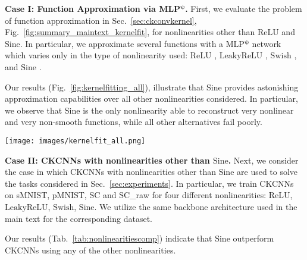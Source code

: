 \documentclass{article}
\newcommand{\mlp}{{\btt MLP}}
\begin{document}
\textbf{Case I: Function Approximation via \mlp$^{\boldsymbol{\psi}}$.} First, we evaluate the problem of function approximation in Sec.~\ref{sec:ckconvkernel}, Fig.~\ref{fig:summary_maintext_kernelfit}, for nonlinearities other than $\mathrm{ReLU}$ and $\mathrm{Sine}$. In particular, we approximate several functions with a \mlp$^{\boldsymbol{\psi}}$ network which varies only in the type of nonlinearity used: $\mathrm{ReLU}$ \citep{nair2010rectified}, $\mathrm{LeakyReLU}$ \citep{xu2015empirical}, $\mathrm{Swish}$ \citep{ramachandran2017searching}, and $\mathrm{Sine}$ \citep{sitzmann2020implicit}. 

Our results (Fig.~\ref{fig:kernelfitting_all}), illustrate that Sine provides astonishing approximation capabilities over all other nonlinearities considered. In particular, we observe that Sine is the only nonlinearity able to reconstruct very nonlinear and very non-smooth functions, while all other alternatives fail poorly.
\begin{figure*}
    \centering
    \texttt{[image: images/kernelfit\_all.png]}
    \vspace{2mm}
    \caption{Function approximation via $\mathrm{ReLU}$, $\mathrm{LeakyReLU}$, $\mathrm{Swish}$ and $\mathrm{Sine}$ networks. All network variants perform a decent job in approximating simple functions. However, for non-linear, non-smooth functions, all networks using nonlinearities other than $\mathrm{Sine}$ provide very poor approximations. Interestingly, the uniform knot initialization proposed in Sec.~\ref{sec:ckconvkernel} provides consistent improvements for all network variants. However, despite this improvement, the approximation results remain insufficient. Contrarily, $\mathrm{Sine}$ networks quickly and seamlessly approximate all functions. All network configurations are equal up to the non-linearities used.}
    \label{fig:kernelfitting_all}
\end{figure*}

\textbf{Case II: CKCNNs with nonlinearities other than $\mathrm{Sine}$.} 
Next, we consider the case in which CKCNNs with nonlinearities other than $\mathrm{Sine}$ are used to solve the tasks considered in Sec.~\ref{sec:experiments}. In particular, we train CKCNNs on sMNIST, pMNIST, SC and SC\_raw for four different nonlinearities: $\mathrm{ReLU}$, $\mathrm{LeakyReLU}$, $\mathrm{Swish}$, $\mathrm{Sine}$. We utilize the same backbone architecture used in the main text for the corresponding dataset. 

Our results (Tab.~\ref{tab:nonlinearitiescomp}) indicate that $\mathrm{Sine}$ outperform CKCNNs using any of the other nonlinearities. 
\end{document}
